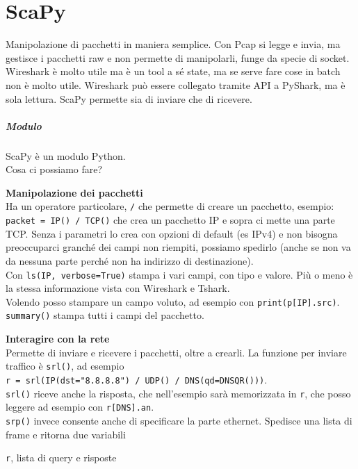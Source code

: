 \documentclass[10pt]{book}
\begin{document}
\chapter{ScaPy}
Manipolazione di pacchetti in maniera semplice. Con Pcap si legge e invia, ma gestisce i pacchetti raw e non permette di manipolarli, funge da specie di socket. Wireshark è molto utile ma è un tool a sé state, ma se serve fare cose in batch non è molto utile. Wireshark può essere collegato tramite API a PyShark, ma è sola lettura. ScaPy permette sia di inviare che di ricevere.
\paragraph{Modulo} ScaPy è un modulo Python.\\
Cosa ci possiamo fare? \begin{list}{}{}
	\item \textbf{Manipolazione dei pacchetti}\\
	Ha un operatore particolare, \texttt{/} che permette di creare un pacchetto, esempio: \texttt{packet = IP() / TCP()} che crea un pacchetto IP e sopra ci mette una parte TCP. Senza i parametri lo crea con opzioni di default (es IPv4) e non bisogna preoccuparci granché dei campi non riempiti, possiamo spedirlo (anche se non va da nessuna parte perché non ha indirizzo di destinazione).\\
	Con \texttt{ls(IP, verbose=True)} stampa i vari campi, con tipo e valore. Più o meno è la stessa informazione vista con Wireshark e Tshark.\\
	Volendo posso stampare un campo voluto, ad esempio con \texttt{print(p[IP].src)}.\\
	\texttt{summary()} stampa tutti i campi del pacchetto.
	\item \textbf{Interagire con la rete}\\
	Permette di inviare e ricevere i pacchetti, oltre a crearli. La funzione per inviare traffico è \texttt{srl()}, ad esempio\\\texttt{r = srl(IP(dst="8.8.8.8") / UDP() / DNS(qd=DNSQR()))}.\\
	\texttt{srl()} riceve anche la risposta, che nell'esempio sarà memorizzata in \texttt{r}, che posso leggere ad esempio con \texttt{r[DNS].an}.\\
	\texttt{srp()} invece consente anche di specificare la parte ethernet. Spedisce una lista di frame e ritorna due variabili
	\begin{list}{}{}
		\item \texttt{r}, lista di query e risposte

\end{list}
\end{list}
\end{document}
